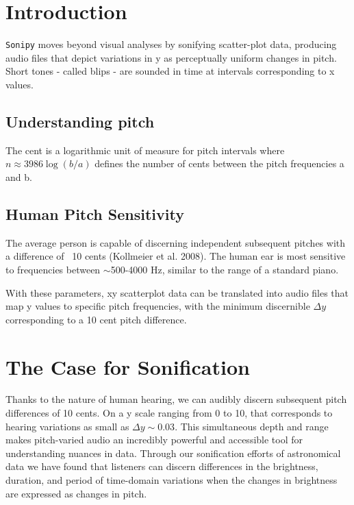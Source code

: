\documentclass[]{acmsiggraph}
\begin{document}
\maketitle
{}

\section{Introduction} \label{sec:introduction}

\texttt{Sonipy} moves beyond visual analyses by sonifying scatter-plot data, producing audio files that depict variations in y as perceptually uniform changes in pitch. Short tones - called blips - are sounded in time at intervals corresponding to x values.

\subsection{Understanding pitch}
The cent is a logarithmic unit of measure for pitch intervals where $n \approx 3986\log(b/a)$ defines the number of cents between the pitch frequencies a and b.

\subsection{Human Pitch Sensitivity}
The average person is capable of discerning independent subsequent pitches with a difference of ~10 cents (Kollmeier et al. 2008). The human ear is most sensitive to frequencies between $\sim$500-4000 Hz, similar to the range of a standard piano.

With these parameters, xy scatterplot data can be translated into audio files that map y values to specific pitch frequencies, with the minimum discernible $\Delta y$ corresponding to a 10 cent pitch difference.

\section{The Case for Sonification}


Thanks to the nature of human hearing, we can audibly discern subsequent pitch differences of 10 cents. On a y scale ranging from 0 to 10, that corresponds to hearing variations as small as $\Delta y\sim0.03$. This simultaneous depth and range makes pitch-varied audio an incredibly powerful and accessible tool for understanding nuances in data. Through our sonification efforts of astronomical data we have found that listeners can discern differences in the brightness, duration, and period of time-domain variations when the changes in brightness are expressed as changes in pitch.
\end{document}
